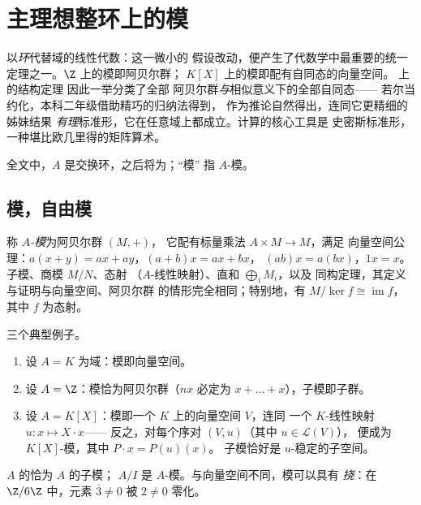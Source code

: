 \chapter{主理想整环上的模}\label{ch:b3:modules}

以\emph{环}代替域的线性代数：这一微小的
假设改动，便产生了代数学中最重要的统一
定理之一。$\Z$ 上的模即阿贝尔群；
$K[X]$ 上的模即配有自同态的向量空间。
上的结构定理
因此一举分类了全部
阿贝尔群\emph{与}相似意义下的全部自同态——
若尔当约化，本科二年级借助精巧的归纳法得到，
作为推论自然得出，连同它更精细的姊妹结果
\emph{有理}标准形，它在任意域上都成立。计算的核心工具是
史密斯标准形，
一种堪比欧几里得的矩阵算术。

全文中，$A$ 是交换环，之后将为；“模”
指 $A$-模。

\section{模，自由模}

\begin{definition}\label{def:b3:modules:module}
称 \emph{$A$-模}为阿贝尔群 $(M, +)$，
它配有标量乘法 $A \times M \to M$，满足
向量空间公理：$a(x + y) = ax + ay$，$(a + b)x = ax + bx$，
$(ab)x = a(bx)$，$1x = x$。子模、商模 $M/N$、态射
（$A$-线性映射）、直和 $\bigoplus_i M_i$，以及
同构定理，其定义与证明与向量空间、阿贝尔群
的情形完全相同；特别地，有 $M/\ker f \cong
\operatorname{im} f$，其中 $f$ 为态射。
\end{definition}

\begin{example}\label{ex:b3:modules:examples}
三个典型例子。
\begin{enumerate}
  \item 设 $A = K$ 为域：模即向量空间。
  \item 设 $A = \Z$：模恰为阿贝尔群（$nx$ 必定为
        $x + \dots + x$），子模即子群。
  \item 设 $A = K[X]$：模即一个 $K$ 上的向量空间 $V$，连同
        一个 $K$-线性映射 $u\colon x \mapsto X\cdot x$——
        反之，对每个序对 $(V, u)$（其中 $u \in \mathcal L(V)$），
        便成为 $K[X]$-模，其中 $P \cdot x = P(u)(x)$。
        子模恰好是 $u$-稳定的子空间。
\end{enumerate}
$A$ 的恰为 $A$ 的子模；
$A/I$ 是 $A$-模。与向量空间不同，模可以具有
\emph{挠}：在 $\Z/6\Z$ 中，元素 $\bar 3 \ne 0$ 被
$2 \neq 0$ 零化。
\end{example}

